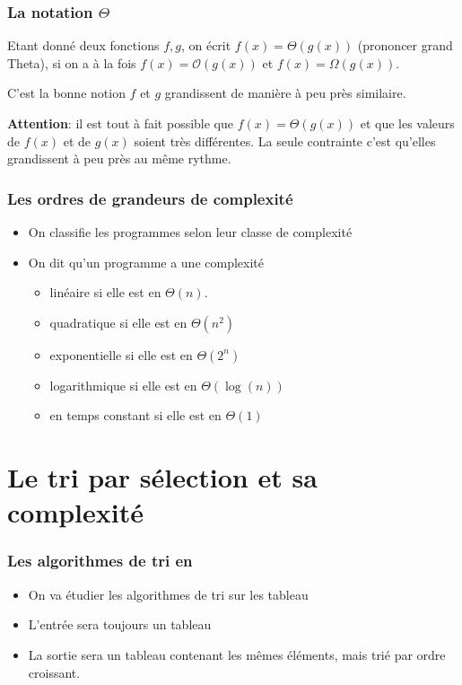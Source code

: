 \documentclass[aspectratio=169]{beamer}
\begin{document}
\begin{frame}
  \frametitle{La notation \texorpdfstring{\(\Theta\)}{grand Theta}}

  \begin{definition}
    Etant donné deux fonctions \(f,g\), on écrit \(f(x) = \Theta(g(x))\)
    (prononcer \og grand Theta\fg{}), si on a à la fois \(f(x) =
    \mathcal{O}(g(x))\) et \(f(x) = \Omega(g(x))\).
  \end{definition}

  \vspace{.5cm} C'est la bonne notion \og \(f\) et \(g\) grandissent de manière
  à peu près similaire\fg{}.

  \vspace{.5cm} \textbf{\alert{Attention}}: il est tout à fait possible que
  \(f(x) = \Theta(g(x))\) et que les valeurs de \(f(x)\) et de \(g(x)\) soient
  très différentes. La seule contrainte c'est qu'elles grandissent à peu près au
  même rythme.
\end{frame}

\begin{frame}
  \frametitle{Les ordres de grandeurs de complexité}
  \begin{itemize}
  \item On classifie les programmes selon leur \alert{classe de complexité}
  \item On dit qu'un programme a une complexité
    \begin{itemize}
    \item linéaire si elle est en \(\Theta(n)\).
    \item quadratique si elle est en \(\Theta(n^{2})\)
    \item exponentielle si elle est en \(\Theta(2^{n})\)
    \item logarithmique si elle est en \(\Theta(\log(n))\)
    \item en temps constant si elle est en \(\Theta(1)\)
    \end{itemize}
  \end{itemize}
\end{frame}

\section{Le tri par sélection et sa complexité}

\begin{frame}
  \frametitle{Les algorithmes de tri en \texorpdfstring{\Cpp}{C++}}

  \begin{itemize}
  \item On va étudier les algorithmes de tri sur les tableau
  \item L'entrée sera toujours un tableau
  \item La sortie sera un tableau contenant les mêmes éléments, mais trié par
    ordre croissant.
  \end{itemize}

\end{frame}
\end{document}
